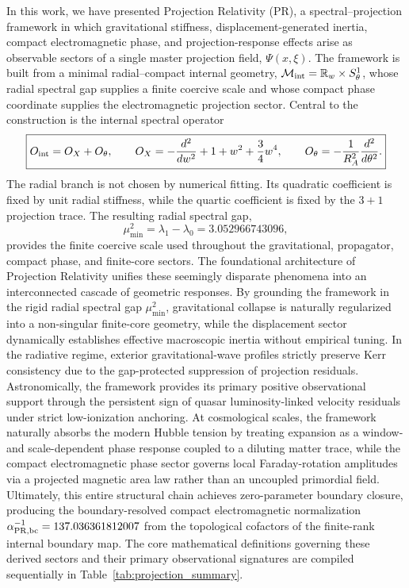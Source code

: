 \documentclass[11pt]{article}
\begin{document}
In this work, we have presented Projection Relativity (PR), a spectral--projection framework in which gravitational stiffness, displacement-generated inertia, compact electromagnetic phase, and projection-response effects arise as observable sectors of a single master projection field, $\Psi(x,\xi)$. The framework is built from a minimal radial--compact internal geometry,
\(\mathcal M_{\rm int}=\mathbb R_w\times S^1_\theta\), whose radial spectral gap supplies a finite coercive scale and whose compact phase coordinate supplies the electromagnetic projection sector. Central to the construction is the internal spectral operator
\begin{equation}
\boxed{
O_{\rm int}
=
O_X+O_\theta,
\qquad
O_X
=
-\frac{d^2}{dw^2}
+
1+w^2+\frac34w^4,
\qquad
O_\theta
=
-\frac{1}{R_A^2}
\frac{d^2}{d\theta^2}.
}
\end{equation}
The radial branch is not chosen by numerical fitting. Its quadratic coefficient is fixed by unit radial stiffness, while the quartic coefficient is fixed by the \(3+1\) projection trace. The resulting radial spectral gap,
\begin{equation}
\boxed{
\mu_{\min}^2
=
\lambda_1-\lambda_0
=
3.052966743096,
}
\end{equation}
provides the finite coercive scale used throughout the gravitational, propagator, compact phase, and finite-core sectors. The foundational architecture of Projection Relativity unifies these seemingly disparate phenomena into an interconnected cascade of geometric responses. By grounding the framework in the rigid radial spectral gap $\mu_{\min}^2$, gravitational collapse is naturally regularized into a non-singular finite-core geometry, while the displacement sector dynamically establishes effective macroscopic inertia without empirical tuning. In the radiative regime, exterior gravitational-wave profiles strictly preserve Kerr consistency due to the gap-protected suppression of projection residuals. Astronomically, the framework provides its primary positive observational support through the persistent sign of quasar luminosity-linked velocity residuals under strict low-ionization anchoring. At cosmological scales, the framework naturally absorbs the modern Hubble tension by treating expansion as a window- and scale-dependent phase response coupled to a diluting matter trace, while the compact electromagnetic phase sector governs local Faraday-rotation amplitudes via a projected magnetic area law rather than an uncoupled primordial field. Ultimately, this entire structural chain achieves zero-parameter boundary closure, producing the boundary-resolved compact electromagnetic normalization \(\alpha_{\rm PR,bc}^{-1}=137.036361812007\) from the topological cofactors of the finite-rank internal boundary map. The core mathematical definitions governing these derived sectors and their primary observational signatures are compiled sequentially in Table~\ref{tab:projection_summary}.
\end{document}
